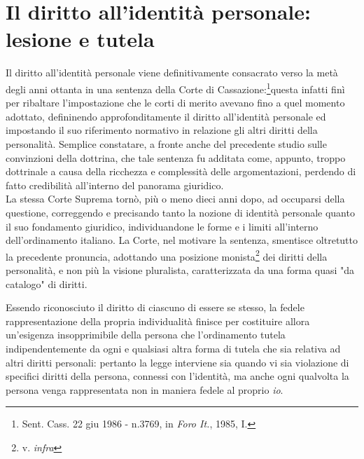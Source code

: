 \section{Il diritto all'identità personale: lesione e tutela}
Il diritto all'identità personale viene definitivamente consacrato verso la metà degli anni ottanta in una sentenza della Corte di Cassazione:\footnote{Sent. Cass. 22 giu 1986 - n.3769, in \textit{Foro It.}, 1985, I.}questa infatti finì per ribaltare l’impostazione che le corti di merito avevano fino a quel momento adottato, defininendo approfonditamente il diritto all’identità personale ed impostando il suo riferimento normativo in relazione gli altri diritti della personalità. Semplice constatare, a fronte anche del precedente studio sulle convinzioni della dottrina, che tale sentenza fu additata come, appunto, troppo dottrinale a causa della ricchezza e complessità delle argomentazioni, perdendo di fatto credibilità all'interno del panorama giuridico. 
\\La stessa Corte Suprema tornò, più o meno dieci anni dopo, ad occuparsi della questione, correggendo e precisando tanto la nozione di identità personale quanto il suo fondamento giuridico, individuandone le forme e i limiti all'interno dell’ordinamento italiano. La Corte, nel motivare la sentenza, smentisce oltretutto la precedente pronuncia, adottando una posizione monista\footnote{v. \textit{infra}} dei diritti della personalità, e non più la visione pluralista, caratterizzata da una forma quasi "da catalogo" di diritti.

Essendo riconosciuto il diritto di ciascuno di essere se stesso, la fedele rappresentazione della propria individualità finisce per costituire allora un’esigenza insopprimibile della persona che l’ordinamento tutela indipendentemente da ogni e qualsiasi altra forma di tutela che sia relativa ad altri diritti personali: pertanto la legge interviene sia quando vi sia violazione di specifici diritti della persona, connessi con l’identità, ma anche ogni qualvolta la persona venga rappresentata non in maniera fedele al proprio \textit{io}.


